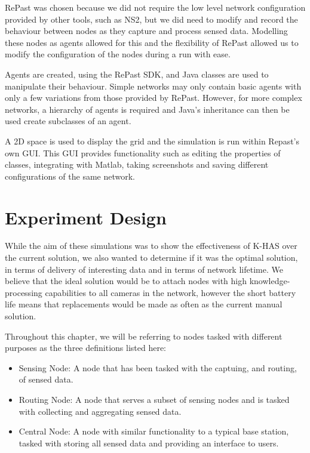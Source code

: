 RePast was chosen because we did not require the low level network configuration provided by other tools, such as NS2, but we did need to modify and record the behaviour between nodes as they capture and process sensed data. Modelling these nodes as agents allowed for this and the flexibility of RePast allowed us to modify the configuration of the nodes during a run with ease.

Agents are created, using the RePast SDK, and Java classes are used to manipulate their behaviour. Simple networks may only contain basic agents with only a few variations from those provided by RePast. However, for more complex networks, a hierarchy of agents is required and Java's inheritance can then be used create subclasses of an agent.

A 2D space is used to display the grid and the simulation is run within Repast's own GUI. This GUI provides functionality such as editing the properties of classes, integrating with Matlab, taking screenshots and saving different configurations of the same network.

\section{Experiment Design}\label{sim:imp}
	While the aim of these simulations was to show the effectiveness of K-HAS over the current solution, we also wanted to determine if it was the optimal solution, in terms of delivery of interesting data and in terms of network lifetime. We believe that the ideal solution would be to attach nodes with high knowledge-processing capabilities to all cameras in the network, however the short battery life means that replacements would be made as often as the current manual solution. 

	Throughout this chapter, we will be referring to nodes tasked with different purposes as the three definitions listed here:
	\begin{itemize}
		\item Sensing Node: A node that has been tasked with the captuing, and routing, of sensed data.
		\item Routing Node: A node that serves a subset of sensing nodes and is tasked with collecting and aggregating sensed data.
		\item Central Node: A node with similar functionality to a typical base station, tasked with storing all sensed data and providing an interface to users.
	\end{itemize}

